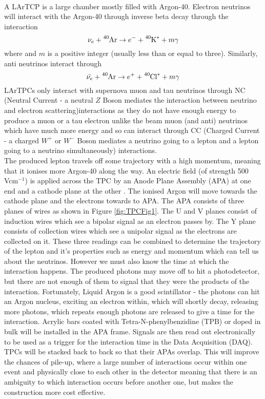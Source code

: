 \documentclass[a4paper,12,oneside,notitlepage]{report}
\begin{document}
\vspace{0.5cm}
\\A LArTCP is a large chamber mostly filled with Argon-40. Electron neutrinos will interact with the Argon-40 through inverse beta decay through the interaction
$$\nu_e + \ce{^{40}Ar} \rightarrow e^- +\ce{^{40}K^*} +m\gamma$$
where and $m$ is a positive integer (usually less than or equal to three). Similarly, anti neutrinos interact through
$$\bar{\nu_e}+\ce{^{40}Ar} \rightarrow e^+ + \ce{^{40}Cl^*}+m \gamma$$
LArTPCs only interact with supernova muon and tau neutrinos through NC (Neutral Current - a neutral $Z$ Boson mediates the interaction between neutrino and electron scattering)interactions as they do not have enough energy to produce a muon or a tau electron unlike the beam muon (and anti) neutrinos which have much more energy and so can interact through CC (Charged Current - a charged $W^+$ or $W^-$ Boson mediates a neutrino going to a lepton and a lepton going to a neutrino simultaneously) interactions.
\vspace{0.5cm}
\\The produced lepton travels off some trajectory with a high momentum, meaning that it ionises more Argon-40 along the way. An electric field (of strength 500 Vcm$^{-1}$) is applied across the TPC by an Anode Plane Assembly (APA) at one end and a cathode plane at the other \cite{LBNEVol4}. The ionised Argon will move towards the cathode plane and the electrons towards to APA. The APA consists of three planes of wires as shown in Figure \ref{fig:TPCFig1}. The U and V planes consist of induction wires which see a bipolar signal as an electron passes by. The Y plane consists of collection wires which see a unipolar signal as the electrons are collected on it. These three readings can be combined to determine the trajectory of the lepton and it's properties such as energy and momentum which can tell us about the neutrinos. However we must also know the time at which the interaction happens. The produced photons may move off to hit a photodetector, but there are not enough of them to signal that they were the products of the interaction. Fortunately, Liquid Argon is a good scintillator - the photons can hit an Argon nucleus, exciting an electron within, which will shortly decay, releasing more photons, which repeats enough photons are released to give a time for the interaction. Acrylic bars coated with Tetra-N-phenylbenzidine (TPB) or doped in bulk will be installed in the APA frame. Signals are then read out electronically to be used as a trigger for the interaction time in the Data Acquisition (DAQ). TPCs will be stacked back to back so that their APAs overlap. This will improve the chances of pile-up, where a large number of interactions occur within one event and physically close to each other in the detector meaning that there is an ambiguity to which interaction occurs before another one, but makes the construction more cost effective.
\end{document}

